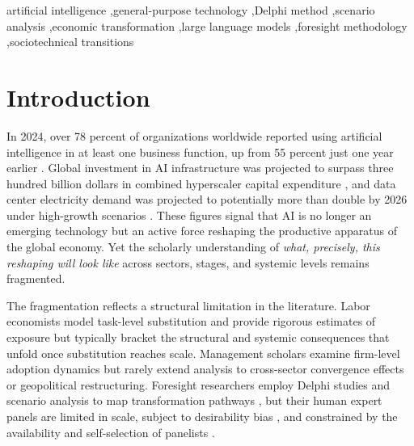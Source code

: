\documentclass[preprint,review,12pt]{elsarticle}
\begin{document}
\begin{frontmatter}
\begin{abstract}
observations requiring larger samples, not established findings. Framed through General Purpose Technology theory and the Multi-Level Perspective, the study contributes a cross-sector transformation map and a scalable, replicable instrument for early-stage foresight, explicitly a hypothesis-generating reconnaissance, not validated forecasting.
\end{abstract}

\begin{keyword}
artificial intelligence \sep general-purpose technology \sep Delphi method \sep scenario analysis \sep economic transformation \sep large language models \sep foresight methodology \sep sociotechnical transitions
\end{keyword}

\end{frontmatter}


\section{Introduction}
\label{sec:introduction}

In 2024, over 78 percent of organizations worldwide reported using artificial intelligence in at least one business function, up from 55 percent just one year earlier \citep{mckinsey2025ai}. Global investment in AI infrastructure was projected to surpass three hundred billion dollars in combined hyperscaler capital expenditure \citep{morganstanley2024capex}, and data center electricity demand was projected to potentially more than double by 2026 under high-growth scenarios \citep{iea2024electricity}. These figures signal that AI is no longer an emerging technology but an active force reshaping the productive apparatus of the global economy. Yet the scholarly understanding of \textit{what, precisely, this reshaping will look like} across sectors, stages, and systemic levels remains fragmented.

The fragmentation reflects a structural limitation in the literature. Labor economists model task-level substitution \citep{acemoglu2018artificial, acemoglu2019automation, acemoglu2022aijobs, eloundou2023gpts, autor2024applying, frank2019toward} and provide rigorous estimates of exposure but typically bracket the structural and systemic consequences that unfold once substitution reaches scale. Management scholars examine firm-level adoption dynamics \citep{raisch2021automation, kanbach2023genai, dwivedi2023chatgpt} but rarely extend analysis to cross-sector convergence effects or geopolitical restructuring. Foresight researchers employ Delphi studies and scenario analysis to map transformation pathways \citep{culot2020manufacturing, fritschy2019autonomous}, but their human expert panels are limited in scale, subject to desirability bias \citep{ecken2011desirability}, and constrained by the availability and self-selection of panelists \citep{foerster2014delphipanel, sokolov2025delphias}.
\end{document}
